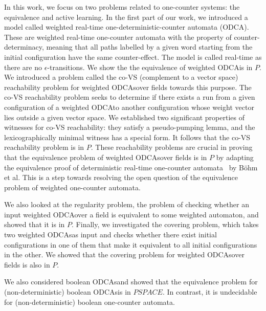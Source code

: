 \documentclass[a4paper,10pt]{article}
\theoremstyle{open}
\newcommand{\odca}{ODCA}
\newcommand{\odcas}{ODCAs}
\begin{document}
In this work, we focus on two problems related to one-counter systems: the equivalence and active learning.
In the first part of our work, we introduced a model called weighted real-time one-deterministic-counter automata (\odca). These are weighted real-time one-counter automata with the property of counter-determinacy, meaning that all paths labelled by a given word starting from the initial configuration have the same counter-effect. The model is called real-time as there are no $\epsilon$-transitions.
We show the the equivalence of weighted \odca is in $P$.
We introduced a problem called the co-VS (complement to a vector space) reachability problem for weighted \odcas over fields towards this purpose. The co-VS reachability problem seeks to determine if there exists a run from a given configuration of a weighted \odca to another configuration whose weight vector lies outside a given vector space. We established two significant properties of witnesses for co-VS reachability: they satisfy a pseudo-pumping lemma, and the lexicographically minimal witness has a special form. It follows that the co-VS reachability problem is in $P$.
These reachability problems are crucial in proving that the equivalence problem of weighted \odcas over fields is in $P$ by adapting the equivalence proof of deterministic real-time one-counter automata~\cite{droca} by B\"ohm et al.  This is a step towards resolving the open question of the equivalence problem of weighted  one-counter automata.

We also looked at the regularity problem, the problem of checking whether an input weighted \odca over a field is equivalent to some weighted automaton, and showed that it is in ${P}$. Finally, we investigated the covering problem, which takes two weighted \odcas as input and checks whether there exist initial configurations in one of them that make it equivalent to all initial configurations in the other. We showed that the covering problem for weighted \odcas over fields is also in ${P}$.

We also considered boolean \odcas and showed that the equivalence problem for (non-deterministic) boolean \odcas is in ${PSPACE}$. In contrast, it is undecidable for (non-deterministic) boolean one-counter automata.
\end{document}

